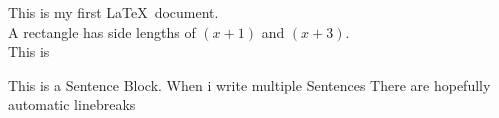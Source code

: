 \documentclass[11pt]{article}
\begin{document}
  This is my first \LaTeX\ document.\\
  A rectangle has side lengths of $(x+1)$ and $(x+3)$.\\
  This is 

  \begin{flushleft}
  This is a Sentence Block. When i write multiple Sentences There are hopefully automatic linebreaks
  \end{flushleft}
  
\end{document}
